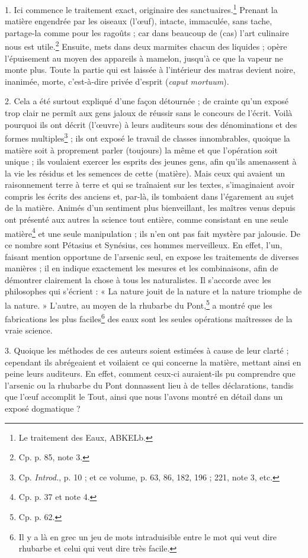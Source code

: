 \documentclass[a4paper, 11pt, oneside, polutonikogreek, french]{article}
\begin{document}
1. Ici commence le traitement exact, originaire des sanctuaires.\footnote{Le traitement des Eaux, ABKELb.} Prenant la matière engendrée par les oiseaux (l'œuf), intacte, immaculée, sans tache, partage-la comme pour les ragoûts ; car dans beaucoup de (cas) l'art culinaire nous est utile.\footnote{Cp. p. 85, note 3.} Ensuite, mets dans deux marmites chacun des liquides ; opère l'épuisement au moyen des appareils à mamelon, jusqu'à ce que la vapeur ne monte plus. Toute la partie qui est laissée à l'intérieur des matras devient noire, inanimée, morte, c'est-à-dire privée d'esprit (\emph{caput mortuum}).

2. Cela a été surtout expliqué d'une façon détournée ; de crainte qu'un exposé trop clair ne permît aux gens jaloux de réussir sans le concours de l'écrit. Voilà pourquoi ils ont décrit (l'œuvre) à leurs auditeurs sous des dénominations et des formes multiples\footnote{Cp. \emph{Introd.}, p. 10 ; et ce volume, p. 63, 86, 182, 196 ; 221, note 3, etc.} ; ils ont exposé le travail de classes innombrables, quoique la matière soit à proprement parler (toujours) la même et que l'opération soit unique ; ils voulaient exercer les esprits des jeunes gens, afin qu'ils amenassent à la vie les résidus et les semences de cette (matière). Mais ceux qui avaient un raisonnement terre à terre et qui se traînaient sur les textes, s'imaginaient avoir compris les écrits des anciens et, par-là, ils tombaient dans l'égarement au sujet de la matière. Animés d'un sentiment plus bienveillant, les maîtres venus depuis ont présenté aux autres la science tout entière, comme consistant en une seule matière\footnote{Cp. p. 37 et note 4.} et une seule manipulation ; ils n'en ont pas fait mystère par jalousie. De ce nombre sont Pétasius et Synésius, ces hommes merveilleux. En effet, l'un, faisant mention opportune de l'arsenic seul, en expose les traitements de diverses manières ; il en indique exactement les mesures et les combinaisons, afin de démontrer clairement la chose à tous les naturalistes. Il s'accorde avec les philosophes qui s'écrient : « La nature jouit de la nature et la nature triomphe de la nature. » L'autre, au moyen de la rhubarbe du Pont,\footnote{Cp. p. 62.} a montré que les fabrications les plus faciles\footnote{Il y a là en grec un jeu de mots intraduisible entre le mot qui veut dire rhubarbe et celui qui veut dire très facile.} des eaux sont les seules opérations maîtresses de la vraie science.

3. Quoique les méthodes de ces auteurs soient estimées à cause de leur clarté ; cependant ils abrégeaient et voilaient ce qui concerne la matière, mettant ainsi en peine leurs auditeurs. En effet, comment ceux-ci auraient-ils pu comprendre que l'arsenic ou la rhubarbe du Pont donnassent lieu à de telles déclarations, tandis que l'œuf accomplit le Tout, ainsi que nous l'avons montré en détail dans un exposé dogmatique ?
\end{document}
